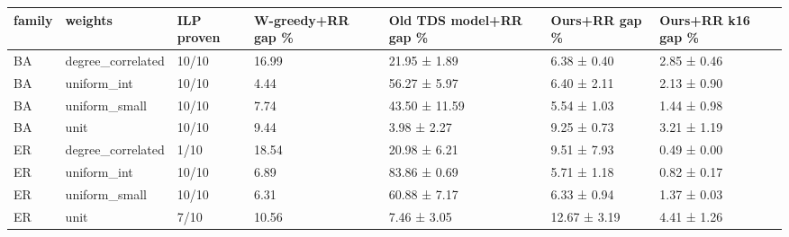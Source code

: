 \begin{tabular}{lllllll}
\toprule
family & weights & ILP proven & W-greedy+RR gap \% & Old TDS model+RR gap \% & Ours+RR gap \% & Ours+RR k16 gap \% \\
\midrule
BA & degree\_correlated & 10/10 & 16.99 & 21.95 ± 1.89 & 6.38 ± 0.40 & 2.85 ± 0.46 \\
BA & uniform\_int & 10/10 & 4.44 & 56.27 ± 5.97 & 6.40 ± 2.11 & 2.13 ± 0.90 \\
BA & uniform\_small & 10/10 & 7.74 & 43.50 ± 11.59 & 5.54 ± 1.03 & 1.44 ± 0.98 \\
BA & unit & 10/10 & 9.44 & 3.98 ± 2.27 & 9.25 ± 0.73 & 3.21 ± 1.19 \\
ER & degree\_correlated & 1/10 & 18.54 & 20.98 ± 6.21 & 9.51 ± 7.93 & 0.49 ± 0.00 \\
ER & uniform\_int & 10/10 & 6.89 & 83.86 ± 0.69 & 5.71 ± 1.18 & 0.82 ± 0.17 \\
ER & uniform\_small & 10/10 & 6.31 & 60.88 ± 7.17 & 6.33 ± 0.94 & 1.37 ± 0.03 \\
ER & unit & 7/10 & 10.56 & 7.46 ± 3.05 & 12.67 ± 3.19 & 4.41 ± 1.26 \\
\bottomrule
\end{tabular}
